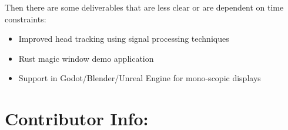 \begin{normalsize}
\noindent
Then there are some deliverables that are less clear or are dependent on time
constraints:

\begin{itemize}
\item Improved head tracking using signal processing techniques
\item Rust magic window demo application
\item Support in Godot/Blender/Unreal Engine for mono-scopic displays
\end{itemize}


\section{Contributor Info:}



\end{normalsize}


